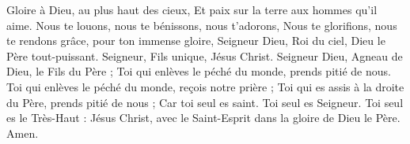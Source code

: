 Gloire à Dieu, au plus haut des cieux, Et paix sur la terre aux hommes qu'il aime. Nous te louons, nous te bénissons, nous t'adorons, Nous te glorifions, nous te rendons grâce, pour ton immense gloire, Seigneur Dieu, Roi du ciel, Dieu le Père tout-puissant. Seigneur, Fils unique, Jésus Christ. Seigneur Dieu, Agneau de Dieu, le Fils du Père ; Toi qui enlèves le péché du monde, prends pitié de nous. Toi qui enlèves le péché du monde, reçois notre prière ; Toi qui es assis à la droite du Père, prends pitié de nous ; Car toi seul es saint. Toi seul es Seigneur. Toi seul es le Très-Haut : Jésus Christ, avec le Saint-Esprit dans la gloire de Dieu le Père. Amen.
